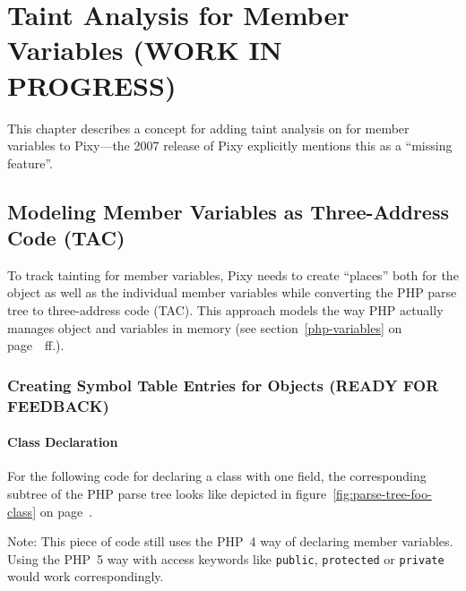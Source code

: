 \chapter{Taint Analysis for Member Variables (WORK IN PROGRESS)}
\label{field-tainting}

This chapter describes a concept for adding taint analysis on for member variables to Pixy---the 2007 release of Pixy explicitly mentions this as a ``missing feature''.

\section{Modeling Member Variables as Three-Address Code (TAC)}

To track tainting for member variables, Pixy needs to create ``places'' both for the object as well as the individual member variables while converting the PHP parse tree to three-address code (TAC). This approach models the way PHP actually manages object and variables in memory (see section~\ref{php-variables} on page~\pageref{php-variables}~ff.).

\subsection{Creating Symbol Table Entries for Objects (READY FOR FEEDBACK)}

\subsubsection{Class Declaration}

For the following code for declaring a class with one field, the corresponding subtree of the PHP parse tree looks like depicted in figure~\ref{fig:parse-tree-foo-class} on page~\pageref{fig:parse-tree-foo-class}.


Note: This piece of code still uses the PHP~4 way of declaring member variables. Using the PHP~5 way with access keywords like \texttt{public}, \texttt{protected} or \texttt{private} would work correspondingly.

